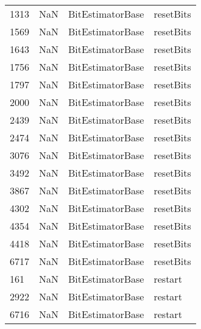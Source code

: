 \begin{tabular}{llll}
1313 &                   NaN &           BitEstimatorBase &                                 resetBits \\
1569 &                   NaN &           BitEstimatorBase &                                 resetBits \\
1643 &                   NaN &           BitEstimatorBase &                                 resetBits \\
1756 &                   NaN &           BitEstimatorBase &                                 resetBits \\
1797 &                   NaN &           BitEstimatorBase &                                 resetBits \\
2000 &                   NaN &           BitEstimatorBase &                                 resetBits \\
2439 &                   NaN &           BitEstimatorBase &                                 resetBits \\
2474 &                   NaN &           BitEstimatorBase &                                 resetBits \\
3076 &                   NaN &           BitEstimatorBase &                                 resetBits \\
3492 &                   NaN &           BitEstimatorBase &                                 resetBits \\
3867 &                   NaN &           BitEstimatorBase &                                 resetBits \\
4302 &                   NaN &           BitEstimatorBase &                                 resetBits \\
4354 &                   NaN &           BitEstimatorBase &                                 resetBits \\
4418 &                   NaN &           BitEstimatorBase &                                 resetBits \\
6717 &                   NaN &           BitEstimatorBase &                                 resetBits \\
161  &                   NaN &           BitEstimatorBase &                                   restart \\
2922 &                   NaN &           BitEstimatorBase &                                   restart \\
6716 &                   NaN &           BitEstimatorBase &                                   restart \\

\end{tabular}
